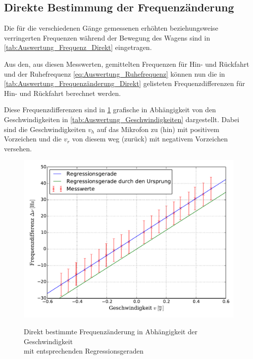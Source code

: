 \subsection{Direkte Bestimmung der Frequenzänderung}
\label{sec:Auswertung_Direkt}
	Die für die verschiedenen Gänge gemessenen erhöhten beziehungsweise verringerten Frequenzen 
	während der Bewegung des Wagens sind in \cref{tab:Auswertung_Frequenz_Direkt} eingetragen.
	
	
	
	Aus den, aus diesen Messwerten, gemittelten Frequenzen für Hin- und Rückfahrt und der Ruhefrequenz
	\cref{eq:Auswertung_Ruhefrequenz} können nun die in \cref{tab:Auswertung_Frequenzänderung_Direkt} gelisteten 
	Frequenzdifferenzen für Hin- und Rückfahrt berechnet werden.
	
	  
	
	Diese Frequenzdifferenzen sind in \cref{fig:Auswertung_Frequenzänderung_direkt} grafische in Abhängigkeit von den 
	Geschwindigkeiten in \cref{tab:Auswertung_Geschwindigkeiten} dargestellt.
	Dabei sind die Geschwindigkeiten $ v_{h} $ auf das Mikrofon zu (hin) mit positivem Vorzeichen  
	und die $ v_{r} $ von diesem weg (zurück) mit negativem Vorzeichen versehen.
	
	\begin{figure}[!h]
		\centering
		\includegraphics[scale=0.7]{Grafiken/Frequenzdifferenz_direkt.pdf}
		\label{fig:Auswertung_Frequenzänderung_direkt}
		\caption{Direkt bestimmte Frequenzänderung in Abhängigkeit der Geschwindigkeit\\\hspace*{2.6cm} mit entsprechenden Regressionsgeraden}
	\end{figure}  
	
